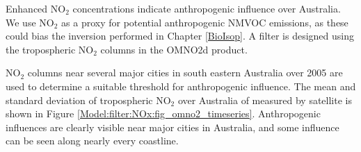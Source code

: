     Enhanced NO$_2$ concentrations indicate anthropogenic influence over Australia.
    We use NO$_2$ as a proxy for potential anthropogenic NMVOC emissions, as these could bias the inversion performed in Chapter \ref{BioIsop}.
    A filter is designed using the tropospheric NO$_2$ columns in the OMNO2d product.
    
    NO$_2$ columns near several major cities in south eastern Australia over 2005 are used to determine a suitable threshold for anthropogenic influence.
    The mean and standard deviation of tropospheric NO$_2$ over Australia of measured by satellite is shown in Figure \ref{Model:filter:NOx:fig_omno2_timeseries}.
    Anthropogenic influences are clearly visible near major cities in Australia, and some influence can be seen along nearly every coastline.
    
